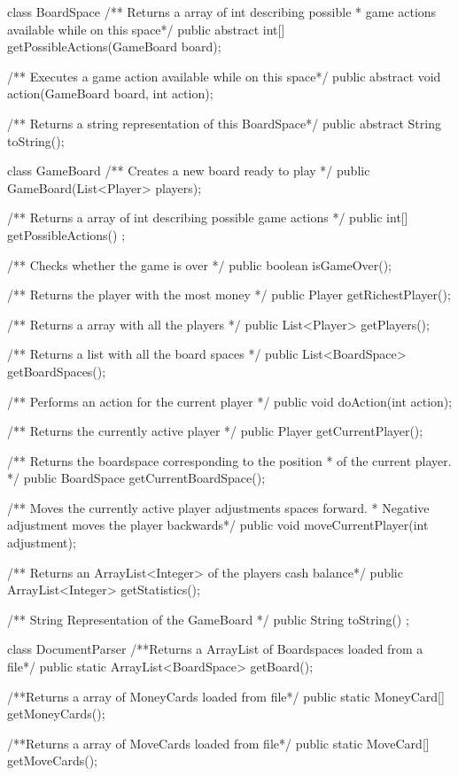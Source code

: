 \begin{JavaSpec}{class BoardSpace}
    /** Returns a array of int describing possible
      * game actions available while on this space*/
    public abstract int[] getPossibleActions(GameBoard board);

    /** Executes a game action available while on this space*/
    public abstract void action(GameBoard board, int action);

    /** Returns a string representation of this BoardSpace*/
    public abstract String toString();
\end{JavaSpec}

\begin{JavaSpec}{class GameBoard}
    /** Creates a new board ready to play */
    public GameBoard(List<Player> players);

    /** Returns a array of int describing possible game actions */
    public int[] getPossibleActions() ;
    
    /** Checks whether the game is over */
    public boolean isGameOver();
    
    /** Returns the player with the most money */
    public Player getRichestPlayer();

    /** Returns a array with all the players */
    public List<Player> getPlayers();

    /** Returns a list with all the board spaces */
    public List<BoardSpace> getBoardSpaces();

    /** Performs an action for the current player */
    public void doAction(int action);
 
    /** Returns the currently active player */
    public Player getCurrentPlayer();

    /** Returns the boardspace corresponding to the position 
      * of the current player. */
    public BoardSpace getCurrentBoardSpace();

    /** Moves the currently active player adjustments spaces forward.
      * Negative adjustment moves the player backwards*/
    public void moveCurrentPlayer(int adjustment);
    
    /** Returns an ArrayList<Integer> of the players cash balance*/
    public ArrayList<Integer> getStatistics();

    /** String Representation of the GameBoard */
    public String toString() ;
\end{JavaSpec}

\begin{JavaSpec}{class DocumentParser}
	/**Returns a ArrayList of Boardspaces loaded from a file*/
	public static ArrayList<BoardSpace> getBoard();

	/**Returns a array of MoneyCards loaded from file*/
	public static MoneyCard[] getMoneyCards();

	/**Returns a array of MoveCards loaded from file*/
	public static MoveCard[] getMoveCards();
\end{JavaSpec}

